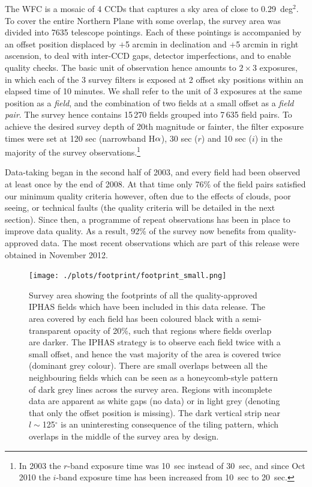 \documentclass[useAMS,usenatbib]{mn2e}
\def\ha{\mbox{H$\rm \alpha$}}
\def\deg{$^{\circ}$}
\begin{document}
The WFC is a mosaic of 4 CCDs 
that captures a sky area of close to 0.29~deg$^2$.
To cover the entire Northern Plane with some overlap,
the survey area was divided into 7635 telescope pointings.
Each of these pointings is accompanied by an offset position
displaced by $+$5 arcmin in declination 
and $+$5 arcmin in right ascension,
to deal with inter-CCD gaps, detector imperfections,
and to enable quality checks. 
The basic unit of observation hence
amounts to $2 \times 3$ exposures, 
in which each of the 3 survey filters is exposed at 2 offset sky positions 
within an elapsed time of 10 minutes.
We shall refer to the unit of 3 exposures at the same position 
as a \emph{field},
and the combination of two fields at a small offset as a \emph{field pair}.
The survey hence contains 15\,270 fields grouped into 7\,635 field pairs.
To achieve the desired survey depth of 20th magnitude or fainter, 
the filter exposure times were set at 120 sec (narrowband \ha), 
30 sec ($r$) and 10 sec ($i$)
in the majority of the survey observations.\footnote{In 2003 
the $r$-band exposure time was 10~sec instead of 30~sec,
and since Oct 2010 the $i$-band exposure time 
has been increased from 10~sec to 20~sec.}

Data-taking began in the second half of 2003, 
and every field had been observed at least once by the end of 2008.
At that time only 76\% of the field pairs 
satisfied our minimum quality criteria however,  
often due to the effects of clouds, poor seeing, or technical faults
(the quality criteria will be detailed in the next section). 
Since then, a programme of repeat observations has been in place 
to improve data quality. 
As a result, 92\% of the survey 
now benefits from quality-approved data.
The most recent observations which are part of this release
were obtained in November 2012.

\begin{figure}
        \texttt{[image: ./plots/footprint/footprint\_small.png]}
        \caption{Survey area showing the footprints
        of all the quality-approved IPHAS fields
        which have been included in this data release.
        The area covered by each field has been coloured black
        with a semi-transparent opacity of 20\%,
        such that regions where fields overlap are darker.
        The IPHAS strategy is to observe each field twice
        with a small offset,
        and hence the vast majority of the area 
        is covered twice (dominant grey colour).
        There are small overlaps between all the neighbouring fields
        which can be seen as a honeycomb-style pattern
        of dark grey lines across the survey area.
        Regions with incomplete data are apparent as white gaps (no data) 
        or in light grey (denoting that only the offset position is missing).
        The dark vertical strip near $l \sim$125\deg
        is an uninteresting consequence of the tiling pattern,
        which overlaps in the middle of the survey area by design.}
        \label{fig:footprint}
\end{figure}
\end{document}
